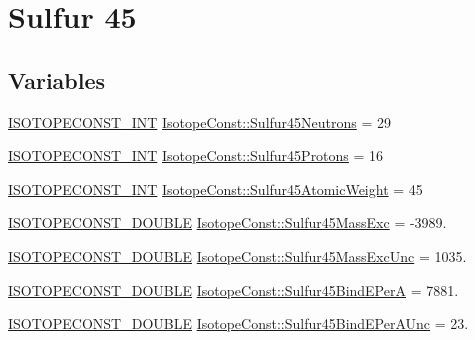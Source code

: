 \hypertarget{group___isotope_const-_sulfur-_s45}{}\section{Sulfur 45}
\label{group___isotope_const-_sulfur-_s45}
\subsection*{Variables}
\begin{DoxyCompactItemize}
\item 
\mbox{\hyperlink{group___isotope_const-_macros_ga5f18360b3e99483a35c32d789e62621c}{I\+S\+O\+T\+O\+P\+E\+C\+O\+N\+S\+T\+\_\+\+I\+NT}} \mbox{\hyperlink{group___isotope_const-_sulfur-_s45_ga469c2ee41cc9d452829de36ed8d3a886}{Isotope\+Const\+::\+Sulfur45\+Neutrons}} = 29
\item 
\mbox{\hyperlink{group___isotope_const-_macros_ga5f18360b3e99483a35c32d789e62621c}{I\+S\+O\+T\+O\+P\+E\+C\+O\+N\+S\+T\+\_\+\+I\+NT}} \mbox{\hyperlink{group___isotope_const-_sulfur-_s45_ga4866bae4ef8e6b996498eed889d0f69c}{Isotope\+Const\+::\+Sulfur45\+Protons}} = 16
\item 
\mbox{\hyperlink{group___isotope_const-_macros_ga5f18360b3e99483a35c32d789e62621c}{I\+S\+O\+T\+O\+P\+E\+C\+O\+N\+S\+T\+\_\+\+I\+NT}} \mbox{\hyperlink{group___isotope_const-_sulfur-_s45_gace5ed53c53f0bf01d94e13ef1f7ed79e}{Isotope\+Const\+::\+Sulfur45\+Atomic\+Weight}} = 45
\item 
\mbox{\hyperlink{group___isotope_const-_macros_ga8f45a7272ce02c0b4c65c44636ed719a}{I\+S\+O\+T\+O\+P\+E\+C\+O\+N\+S\+T\+\_\+\+D\+O\+U\+B\+LE}} \mbox{\hyperlink{group___isotope_const-_sulfur-_s45_ga46b6958546c93015281c122d11139247}{Isotope\+Const\+::\+Sulfur45\+Mass\+Exc}} = -\/3989.
\item 
\mbox{\hyperlink{group___isotope_const-_macros_ga8f45a7272ce02c0b4c65c44636ed719a}{I\+S\+O\+T\+O\+P\+E\+C\+O\+N\+S\+T\+\_\+\+D\+O\+U\+B\+LE}} \mbox{\hyperlink{group___isotope_const-_sulfur-_s45_ga95a711e52e774c9145dafee8cc3d0563}{Isotope\+Const\+::\+Sulfur45\+Mass\+Exc\+Unc}} = 1035.
\item 
\mbox{\hyperlink{group___isotope_const-_macros_ga8f45a7272ce02c0b4c65c44636ed719a}{I\+S\+O\+T\+O\+P\+E\+C\+O\+N\+S\+T\+\_\+\+D\+O\+U\+B\+LE}} \mbox{\hyperlink{group___isotope_const-_sulfur-_s45_ga8e0d3fad066b5bb413c5a08b0ea59d01}{Isotope\+Const\+::\+Sulfur45\+Bind\+E\+PerA}} = 7881.
\item 
\mbox{\hyperlink{group___isotope_const-_macros_ga8f45a7272ce02c0b4c65c44636ed719a}{I\+S\+O\+T\+O\+P\+E\+C\+O\+N\+S\+T\+\_\+\+D\+O\+U\+B\+LE}} \mbox{\hyperlink{group___isotope_const-_sulfur-_s45_ga55db7854a2fa9baa2e75fc352c8cb81c}{Isotope\+Const\+::\+Sulfur45\+Bind\+E\+Per\+A\+Unc}} = 23.

\end{DoxyCompactItemize}
